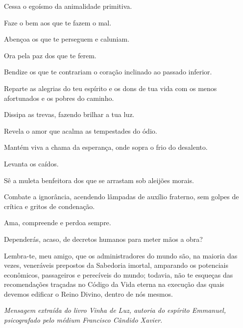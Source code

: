 \emdash{}Cessa o egoísmo da animalidade primitiva.

\emdash{}Faze o bem aos que te fazem o mal.

\emdash{}Abençoa os que te perseguem e caluniam.

\emdash{}Ora pela paz dos que te ferem.

\emdash{}Bendize os que te contrariam o coração inclinado ao passado inferior.

\emdash{}Reparte as alegrias do teu espírito e os dons de tua vida com os menos afortunados e os pobres do caminho.

\emdash{}Dissipa as trevas, fazendo brilhar a tua luz.

\emdash{}Revela o amor que acalma as tempestades do ódio.

\emdash{}Mantém viva a chama da esperança, onde sopra o frio do desalento.

\emdash{}Levanta os caídos.

\emdash{}Sê a muleta benfeitora dos que se arrastam sob aleijões morais.

\emdash{}Combate a ignorância, acendendo lâmpadas de auxílio fraterno, sem golpes de crítica e gritos de condenação.

\emdash{}Ama, compreende e perdoa sempre.

\emdash{}Dependerás, acaso, de decretos humanos para meter mãos a obra?

\emdash{}Lembra-te, meu amigo, que os administradores do mundo são, na maioria das vezes, veneráveis prepostos da Sabedoria imortal, amparando os potenciais econômicos, passageiros e perecíveis do mundo; todavia, não te esqueças das recomendações traçadas no Código da Vida eterna na execução das quais devemos edificar o Reino Divino, dentro de nós mesmos.

\emdash{}\textit{Mensagem extraída do livro Vinha de Luz, autoria do espírito Emmanuel, psicografado pelo médium Francisco Cândido Xavier}.
